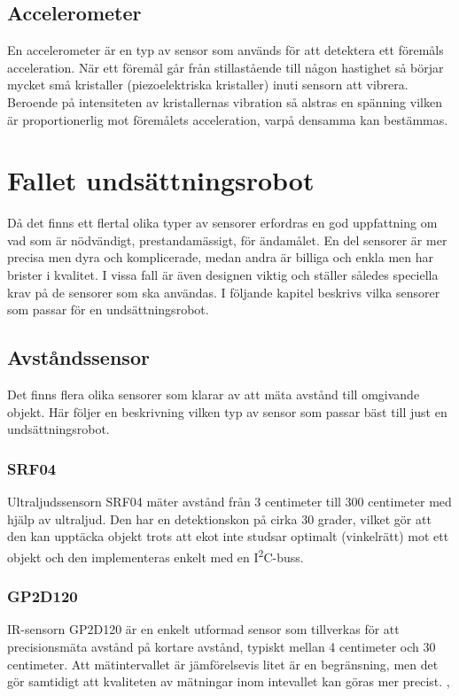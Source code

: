 \documentclass[11pt]{article}
\begin{document}
\begin{flushleft}
\subsection{Accelerometer}
En accelerometer är en typ av sensor som används för att detektera ett föremåls acceleration. När ett föremål går från stillastående till någon hastighet så börjar mycket små kristaller (piezoelektriska kristaller) inuti sensorn att vibrera. Beroende på intensiteten av kristallernas vibration så alstras en spänning vilken är proportionerlig mot föremålets acceleration, varpå densamma kan bestämmas. \cite{Accelerometer}




\pagebreak
\section{Fallet undsättningsrobot}
Då det finns ett flertal olika typer av sensorer erfordras en god uppfattning om vad som är nödvändigt, prestandamässigt, för ändamålet. En del sensorer är mer precisa men dyra och komplicerade, medan andra är billiga och enkla men har brister i kvalitet. I vissa fall är även designen viktig och ställer således speciella krav på de sensorer som ska användas. I följande kapitel beskrivs vilka sensorer som passar för en undsättningsrobot. 

\subsection{Avståndssensor}
Det finns flera olika sensorer som klarar av att mäta avstånd till omgivande objekt. Här följer en beskrivning vilken typ av sensor som passar bäst till just en undsättningsrobot. 

\subsubsection{SRF04} %
Ultraljudssensorn SRF04 mäter avstånd från 3 centimeter till 300 centimeter med hjälp av ultraljud. Den har en detektionskon på cirka 30 grader, vilket gör att den kan upptäcka objekt trots att ekot inte studsar optimalt (vinkelrätt) mot ett objekt och den implementeras enkelt med en I\textsuperscript{2}C-buss. \cite{Devantech}

\subsubsection{GP2D120} %
IR-sensorn GP2D120 är en enkelt utformad sensor som tillverkas för att precisionsmäta avstånd på kortare avstånd, typiskt mellan 4 centimeter och 30 centimeter. Att mätintervallet är jämförelsevis litet är en begränsning, men det gör samtidigt att kvaliteten av mätningar inom intevallet kan göras mer precist. \cite{website:cmu}, \cite{Sharp}


\end{flushleft}
\end{document}
